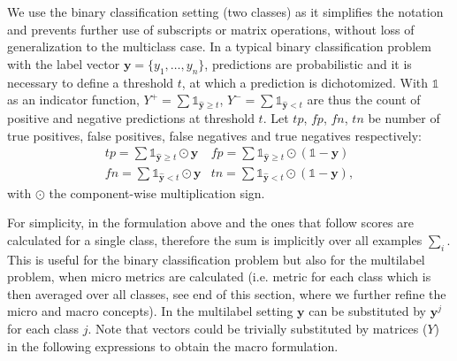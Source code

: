 

We use the binary classification setting (two classes) as it simplifies the notation and prevents further use of subscripts or matrix operations, without loss of generalization to the multiclass case.
In a typical binary classification problem with the label vector $\mathbf{y} = \{y_1 , \ldots, y_n\}$, predictions are probabilistic and it is necessary to define a threshold \(t\), at which a prediction is dichotomized. With \(\mathds{1}\) as an indicator function, \(Y^+ = \sum \mathds{1}_{\hat{\mathbf{y}} \geq t}\), \(Y^- = \sum \mathds{1}_{\hat{\mathbf{y}} < t}\) are thus the count of positive and negative predictions at threshold \(t\). Let \(tp\), \(fp\), \(fn\), \(tn\) be number of true positives, false positives, false negatives and true negatives respectively:
%
\begin{equation}
\label{eq:conf}
\begin{array}{ll}\mathit{tp} = \sum \mathds{1}_{\hat{\mathbf{y}} \geq t} \odot \mathbf{y}  & \mathit{fp} = \sum \mathds{1}_{\hat{\mathbf{y}} \geq t} \odot (\mathds{1} - \mathbf{y}) \\[.5em] \mathit{fn} = \sum \mathds{1}_{\hat{\mathbf{y}} < t} \odot \mathbf{y} & \mathit{tn} = \sum \mathds{1}_{\hat{\mathbf{y}} < t} \odot (\mathds{1} - \mathbf{y}),
\end{array}
\end{equation}
%
with \(\odot\) the component-wise multiplication sign.


For simplicity, in the formulation above and the ones that follow scores are calculated for a single class, therefore the sum is implicitly over all examples \(\sum_i\). This is useful for the binary classification problem but also for the multilabel problem, when micro metrics are calculated (i.e. metric for each class which is then averaged over all classes, see end of this section, where we further refine the micro and macro concepts). In the multilabel setting $\mathbf{y}$ can be substituted by $\mathbf{y}^j$ for each class $j$. Note that vectors could be trivially substituted by matrices ($Y$) in the following expressions to obtain the macro formulation.


